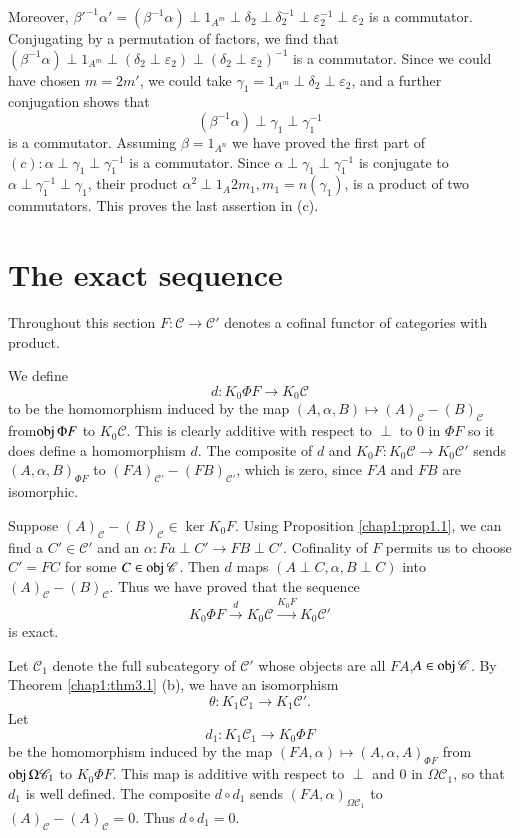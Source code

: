 Moreover, $\beta'^{-1} \alpha' = (\beta^{-1} \alpha) \perp 1_{A^m}
\perp \delta_2 \perp \delta^{-1}_2 \perp \varepsilon^{-1}_2 \perp
\varepsilon_2$ is a commutator. Conjugating by a permutation of
factors, we find that $(\beta^{-1} \alpha) \perp 1_{A^m} \perp
(\delta_2 \perp \varepsilon_2) \perp (\delta_2 \perp
\varepsilon_2)^{-1}$ is a commutator. Since we could have chosen $m =
2m'$, we could take $\gamma_1 = 1_{A^m} \perp \delta_2 \perp
\varepsilon_2$, and a further conjugation shows that 
$$
(\beta^{-1} \alpha) \perp \gamma_1 \perp \gamma^{-1}_1 
$$
is a commutator. Assuming $\beta = 1_{A^n}$ we have proved the first
part of $(c) : \alpha \perp \gamma_1 \perp \gamma^{-1}_1$ is a
commutator. Since $\alpha \perp \gamma_1 \perp \gamma^{-1}_1$ is
conjugate to $\alpha \perp \gamma_1^{-1} \perp \gamma_1$, their
product $\alpha^2 \perp 1_{A} 2m_1, m_1 = n(\gamma_1)$, is a product
of two commutators. This proves the last assertion in (c). 


\section{The exact sequence}\label{chap1:sec4}%

Throughout this section $F : \mathscr{C} \to \mathscr{C}'$ denotes a
cofinal functor of categories with product. 

We define
$$
d : K_0 \Phi F \to K_0 \mathscr{C}
$$
to be the homomorphism induced by the map $(A, \alpha, B) \mapsto
(A)_{\mathscr{C}} - (B)_{\mathscr{C}}$ from\pageoriginale  $\operatorname{obj} \Phi F$ to $K_0
\mathscr{C}$. This is clearly additive with respect to $\perp$ to $0$
in $\Phi F$ so it does define a homomorphism $d$. The composite of $d$ and
$K_0 F : K_0 \mathscr{C} \to K_0 \mathscr{C}'$ sends $( A,
\alpha,B)_{{\Phi} F}$ to $(FA)_{\mathscr{C}'} - (FB)_{\mathscr{C}'}$,
which is zero, since $FA$ and $FB$ are isomorphic. 

Suppose $(A)_{\mathscr{C}} - (B)_{\mathscr{C}} \in \ker K_0 F$. Using
Proposition \ref{chap1:prop1.1}, we can find a $C' \in \mathscr{C}'$
and an $\alpha : 
Fa \perp C' \to FB \perp C'$. Cofinality of $F$ permits us to choose
$C' = FC$ for some $C \in  \operatorname{obj} \mathscr{C}$. Then $d$ maps $(A \perp
C, \alpha, B \perp C)$ into $(A)_{\mathscr{C}} -
(B)_{\mathscr{C}}$. Thus we have proved that the sequence 
$$
K_0 \Phi F \xrightarrow{d} K_0 \mathscr{C} \xrightarrow{K_0 F} K_0
\mathscr{C}' 
$$
is exact.


Let $\mathscr{C}_1$ denote the full subcategory of $\mathscr{C}'$ whose
objects are all $FA$,\break $A \in \operatorname{obj} \mathscr{C}$. By Theorem
\ref{chap1:thm3.1} (b), we 
have an isomorphism 
$$
\theta : K_1 \mathscr{C}_1 \to K_1 \mathscr{C}'.  
$$
Let 
$$
d_1 : K_1 \mathscr{C}_1 \to K_0 \Phi F  
$$
be the homomorphism induced by the map $(FA, \alpha) \mapsto (A,
\alpha, A)_{\Phi F}$ from $\operatorname{obj} \Omega \mathscr{C}_1$ to $K_0 \Phi
F$. This map is additive with respect to $\perp$ and 0 in $\Omega
\mathscr{C}_1$, so that $d_1$ is well defined. The composite $d \circ d_1$
sends $(FA, \alpha)_{\Omega \mathscr{C}_1}$ to $(A)_{\mathscr{C}} -
(A)_{\mathscr{C}} = 0$. Thus $d \circ d_1 = 0$. 


